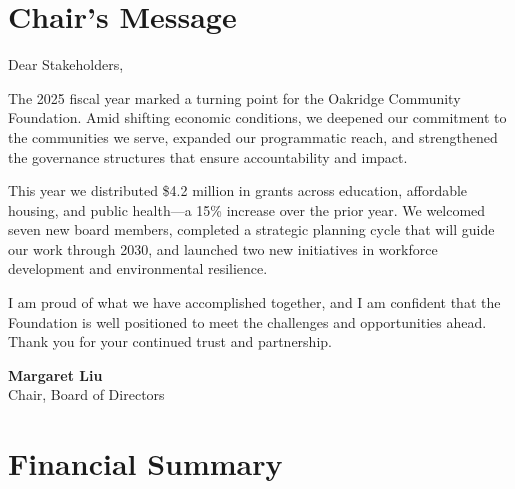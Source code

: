 \documentclass[
    language=english,
    doctype=article,
    institution=none,
]{../../omnilatex}
\begin{document}
\maketitle

\section*{Chair's Message}

Dear Stakeholders,

The 2025 fiscal year marked a turning point for the Oakridge Community
Foundation. Amid shifting economic conditions, we deepened our commitment
to the communities we serve, expanded our programmatic reach, and
strengthened the governance structures that ensure accountability and
impact.

This year we distributed \$4.2 million in grants across education,
affordable housing, and public health---a 15\% increase over the prior
year. We welcomed seven new board members, completed a strategic planning
cycle that will guide our work through 2030, and launched two new
initiatives in workforce development and environmental resilience.

I am proud of what we have accomplished together, and I am confident that
the Foundation is well positioned to meet the challenges and opportunities
ahead. Thank you for your continued trust and partnership.

\vspace{1em}
\noindent\textbf{Margaret Liu}\\
Chair, Board of Directors

\section{Financial Summary}
\end{document}

